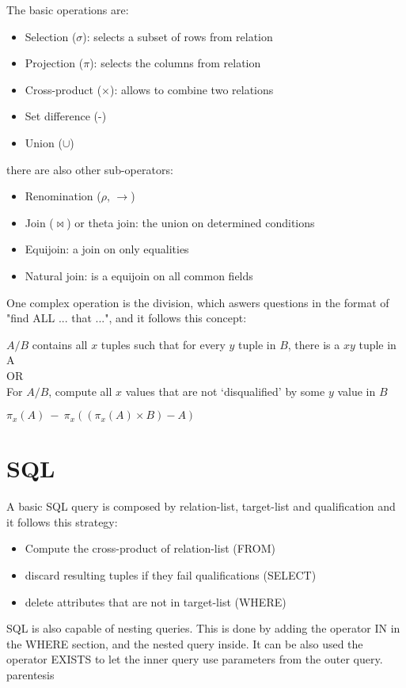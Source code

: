 \documentclass[12pt, a4paper]{article}
\begin{document}
The basic operations are:
\begin{itemize}
    \item Selection ($\sigma$): selects a subset of rows from relation 
    \item Projection ($\pi$): selects the columns from relation
    \item Cross-product ($\times$): allows to combine two relations
    \item Set difference (-) 
    \item Union ($\cup$)
\end{itemize}
there are also other sub-operators:
\begin{itemize}
    \item Renomination ($\rho$, $\rightarrow$)
    \item Join ($\Join$) or theta join: the union on determined conditions
    \item Equijoin: a join on only equalities
    \item Natural join: is a equijoin on all common fields
\end{itemize}

One complex operation is the division, which aswers questions in the format of "find ALL ... that ...",
and it follows this concept:
\begin{center}
    $A/B$ contains all $x$ tuples such that for every $y$ tuple in $B$, there is a $xy$ tuple in A\\
    OR\\
    For $A/B$, compute all $x$ values that are not `disqualified’ by some $y$ value in $B$

    $\pi_{x}(A)\ -\ \pi_{x}((\pi_{x}(A)\times B)-A)$
\end{center}
 

\newpage
\section{SQL}
A basic SQL query is composed by relation-list, target-list and qualification and it follows this strategy:
\begin{itemize}
    \item Compute the cross-product of relation-list (FROM)
    \item discard resulting tuples if they fail qualifications (SELECT)
    \item delete attributes that are not in target-list (WHERE)
\end{itemize}
SQL is also capable of nesting queries. This is done by adding the operator IN in the WHERE section, and the nested 
query inside. It can be also used the operator EXISTS to let the inner query use parameters from the outer query. 
parentesis
\end{document}
